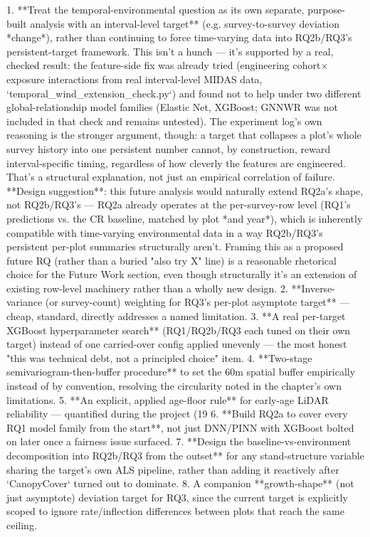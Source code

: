 1. **Treat the temporal-environmental question as its own separate, purpose-built analysis with an interval-level target** (e.g. survey-to-survey deviation *change*), rather than continuing to force time-varying data into RQ2b/RQ3's persistent-target framework. This isn't a hunch — it's supported by a real, checked result: the feature-side fix was already tried (engineering cohort$\times$exposure interactions from real interval-level MIDAS data, `temporal_wind_extension_check.py`) and found not to help under two different global-relationship model families (Elastic Net, XGBoost; GNNWR was not included in that check and remains untested). The experiment log's own reasoning is the stronger argument, though: a target that collapses a plot's whole survey history into one persistent number cannot, by construction, reward interval-specific timing, regardless of how cleverly the features are engineered. That's a structural explanation, not just an empirical correlation of failure. **Design suggestion**: this future analysis would naturally extend RQ2a's shape, not RQ2b/RQ3's — RQ2a already operates at the per-survey-row level (RQ1's predictions vs. the CR baseline, matched by plot *and year*), which is inherently compatible with time-varying environmental data in a way RQ2b/RQ3's persistent per-plot summaries structurally aren't. Framing this as a proposed future RQ (rather than a buried "also try X" line) is a reasonable rhetorical choice for the Future Work section, even though structurally it's an extension of existing row-level machinery rather than a wholly new design.
2. **Inverse-variance (or survey-count) weighting for RQ3's per-plot asymptote target** — cheap, standard, directly addresses a named limitation.
3. **A real per-target XGBoost hyperparameter search** (RQ1/RQ2b/RQ3 each tuned on their own target) instead of one carried-over config applied unevenly — the most honest "this was technical debt, not a principled choice" item.
4. **Two-stage semivariogram-then-buffer procedure** to set the 60m spatial buffer empirically instead of by convention, resolving the circularity noted in the chapter's own limitations.
5. **An explicit, applied age-floor rule** for early-age LiDAR reliability — quantified during the project (19%
6. **Build RQ2a to cover every RQ1 model family from the start**, not just DNN/PINN with XGBoost bolted on later once a fairness issue surfaced.
7. **Design the baseline-vs-environment decomposition into RQ2b/RQ3 from the outset** for any stand-structure variable sharing the target's own ALS pipeline, rather than adding it reactively after `CanopyCover` turned out to dominate.
8. A companion **growth-shape** (not just asymptote) deviation target for RQ3, since the current target is explicitly scoped to ignore rate/inflection differences between plots that reach the same ceiling.

